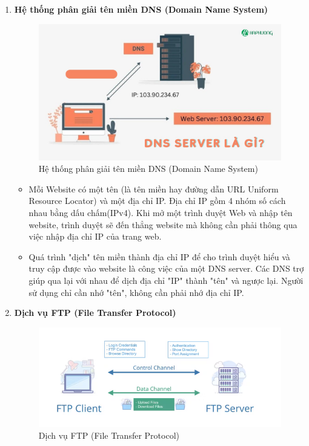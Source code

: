 \documentclass[13pt]{article}
\begin{document}
\begin{enumerate}
    \item \textbf{Hệ thống phân giải tên miền DNS (Domain Name System)}
    \begin{figure}[h!]
        \centering
        \includegraphics[width=0.7\linewidth]{image/2.jpg}
            \caption{Hệ thống phân giải tên miền DNS (Domain Name System)}
            \label{fig:label1}
    \end{figure}
    
    \begin{itemize}
        \item Mỗi Website có một tên (là tên miền hay đường dẫn URL Uniform Resource Locator) và một địa chỉ IP. Địa chỉ IP gồm 4 nhóm số cách nhau bằng dấu chấm(IPv4). Khi mở một trình duyệt Web và nhập tên website, trình duyệt sẽ đến thẳng website mà không cần phải thông qua việc nhập địa chỉ IP của trang web. 
        \item Quá trình "dịch" tên miền thành địa chỉ IP để cho trình duyệt hiểu và truy cập được vào website là công việc của một DNS server. Các DNS trợ giúp qua lại với nhau để dịch địa chỉ "IP" thành "tên" và ngược lại. Người sử dụng chỉ cần nhớ "tên", không cần phải nhớ địa chỉ IP.
    \end{itemize}

    \item \textbf{Dịch vụ FTP (File Transfer Protocol)}
    \begin{figure}[h!]
        \centering
        \includegraphics[width=0.7\linewidth]{image/3.png}
            \caption{Dịch vụ FTP (File Transfer Protocol)}
            \label{fig:label1}
    \end{figure}
    

\end{enumerate}
\end{document}
